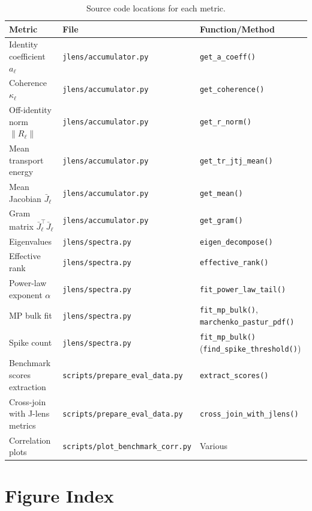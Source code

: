 \documentclass[11pt,a4paper]{article}
\begin{document}
\begin{table}[H]
\centering
\caption{Source code locations for each metric.}
\label{tab:sources}
\begin{tabular}{lll}
\toprule
Metric & File & Function/Method \\
\midrule
Identity coefficient $a_\ell$     & \texttt{jlens/accumulator.py} & \texttt{get\_a\_coeff()} \\
Coherence $\kappa_\ell$           & \texttt{jlens/accumulator.py} & \texttt{get\_coherence()} \\
Off-identity norm $\|R_\ell\|$    & \texttt{jlens/accumulator.py} & \texttt{get\_r\_norm()} \\
Mean transport energy            & \texttt{jlens/accumulator.py} & \texttt{get\_tr\_jtj\_mean()} \\
Mean Jacobian $\bar{J}_\ell$      & \texttt{jlens/accumulator.py} & \texttt{get\_mean()} \\
Gram matrix $\bar{J}_\ell^\top\bar{J}_\ell$ & \texttt{jlens/accumulator.py} & \texttt{get\_gram()} \\
Eigenvalues                      & \texttt{jlens/spectra.py}     & \texttt{eigen\_decompose()} \\
Effective rank                   & \texttt{jlens/spectra.py}     & \texttt{effective\_rank()} \\
Power-law exponent $\alpha$      & \texttt{jlens/spectra.py}     & \texttt{fit\_power\_law\_tail()} \\
MP bulk fit                      & \texttt{jlens/spectra.py}     & \texttt{fit\_mp\_bulk()}, \texttt{marchenko\_pastur\_pdf()} \\
Spike count                      & \texttt{jlens/spectra.py}     & \texttt{fit\_mp\_bulk()} (\texttt{find\_spike\_threshold()}) \\
\midrule
Benchmark scores extraction       & \texttt{scripts/prepare\_eval\_data.py} & \texttt{extract\_scores()} \\
Cross-join with J-lens metrics   & \texttt{scripts/prepare\_eval\_data.py} & \texttt{cross\_join\_with\_jlens()} \\
Correlation plots                & \texttt{scripts/plot\_benchmark\_corr.py} & Various \\
\bottomrule
\end{tabular}
\end{table}

\section{Figure Index}
\end{document}
